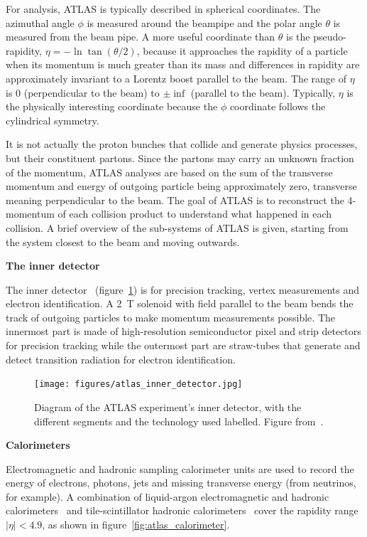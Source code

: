 For analysis, ATLAS is typically described in spherical coordinates. The azimuthal angle $\phi$ is measured around the beampipe and the polar angle $\theta$ is measured from the beam pipe. A more useful coordinate than $\theta$ is the pseudo-rapidity, $\eta = -\ln\tan\left(\theta/2\right)$, because it approaches the rapidity of a particle when its momentum is much greater than its mass and differences in rapidity are approximately invariant to a Lorentz boost parallel to the beam. The range of $\eta$ is 0 (perpendicular to the beam) to $\pm\inf$ (parallel to the beam). Typically, $\eta$ is the physically interesting coordinate because the $\phi$ coordinate follows the cylindrical symmetry.

It is not actually the proton bunches that collide and generate physics processes, but their constituent partons. Since the partons may carry an unknown fraction of the momentum, ATLAS analyses are based on the sum of the transverse momentum and energy of outgoing particle being approximately zero, transverse meaning perpendicular to the beam. The goal of ATLAS is to reconstruct the 4-momentum of each collision product to understand what happened in each collision. A brief overview of the sub-systems of ATLAS is given, starting from the system closest to the beam and moving outwards. 

\textbf{The inner detector}

The inner detector~\cite{atlas_inner_detector_tdr_1, atlas_inner_detector_tdr_2} (figure~\ref{fig:atlas_inner_detector}) is for precision tracking, vertex measurements and electron identification. A \SI{2}{\tesla} solenoid with field parallel to the beam bends the track of outgoing particles to make momentum measurements possible. The innermost part is made of high-resolution semiconductor pixel and strip detectors for precision tracking while the outermost part are straw-tubes that generate and detect transition radiation for electron identification.

\begin{figure}
    \centering
    \texttt{[image: figures/atlas\_inner\_detector.jpg]}
    \caption{Diagram of the ATLAS experiment's inner detector, with the different segments and the technology used labelled. Figure from~\cite{collaboration_atlas_2008}.}
    \label{fig:atlas_inner_detector}
\end{figure}

\textbf{Calorimeters}

Electromagnetic and hadronic sampling calorimeter units are used to record the energy of electrons, photons, jets and missing transverse energy (from neutrinos, for example). A combination of liquid-argon electromagnetic and hadronic calorimeters~\cite{atlas_lar_cal_tdr} and tile-scintillator hadronic calorimeters~\cite{atlas_tile_cal_tdr} cover the rapidity range $|\eta| < 4.9$, as shown in figure~\ref{fig:atlas_calorimeter}.

